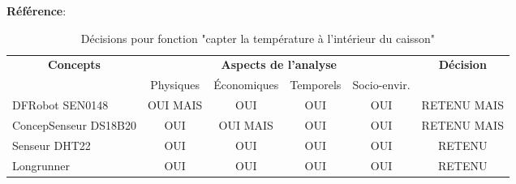 \textbf{Référence}: \cite{longrunner}


\begin{table}[!htbp]
	\begin{tabular}{|l|c|c|c|c|c|}
		\hline
		\multicolumn{1}{|c|}{\multirow{2}{*}{\textbf{Concepts}}} & \multicolumn{4}{c|}{\textbf{Aspects de l'analyse}} & \multirow{2}{*}{\textbf{Décision}} \\ \cline{2-5}
		\multicolumn{1}{|c|}{}                                   & Physiques & Économiques & Temporels & Socio-envir. &                                    \\ \hline
		DFRobot SEN0148                                                 & OUI MAIS      & OUI         & OUI       & OUI          & RETENU MAIS                            \\ \hline
		ConcepSenseur DS18B20                                                 & OUI       & OUI MAIS       & OUI       & OUI          & RETENU MAIS                            \\ \hline
		Senseur DHT22                                                 & OUI       & OUI         & OUI       & OUI          & RETENU                             \\ \hline
		Longrunner                                                 & OUI       & OUI         & OUI       & OUI          & RETENU	        \\ \hline
	\end{tabular}
	\caption{Décisions pour fonction "capter la température à l’intérieur du caisson"}
	\label{tab:fct_tempscaisson}
\end{table}
